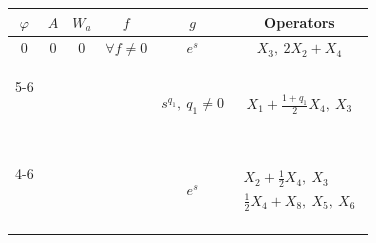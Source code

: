 \begin{center}
\begin{tabular}{|c|c|c|c|c|c|}
\hline 


$\varphi$ & $A$ & $W_a$ & $f$ & $g$ & Operators \\ 


\hline 


0 & 0 & 0 & $\forall f\ne 0$ & $e^s$ & 


\myrule $X_3,\ 2X_2+X_4$ \\


\cline{5-6} \myrule


\ & \ & \ & \ & $s^{q_1},\ q_1\ne0$ &


$X_1+\frac{1+q_1}{2}X_4,\ X_3$ \\




\cline{4-6}\mybrule


\ & \ & \ & \ & $e^s$ &


$\begin{matrix}X_2+\frac12 X_4,\ X_3\\


\frac12 X_4+X_8,\ X_5,\ X_6\end{matrix}$ \\


\hline


\end{tabular} 


\end{center} 


 




















